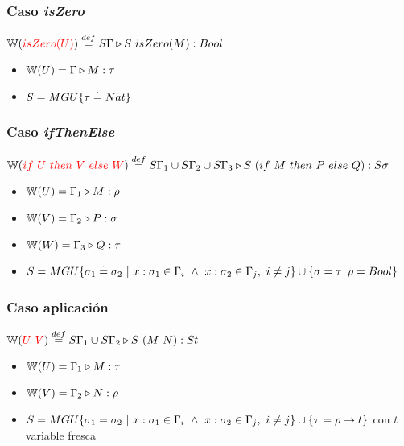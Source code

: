 \subsubsection{Caso \textit{isZero}}
$\mathbb{W}({\color{red}isZero(U)}) \overset{def}{=} S\Gamma\triangleright S~isZero(M) : Bool$
\begin{centrado}
	\begin{itemize}
		\item $\mathbb{W}(U) = \Gamma\triangleright M : \tau$
		\item $S = MGU\{\tau\overset{\cdot}{=} Nat\}$
	\end{itemize}
\end{centrado}

\subsubsection{Caso \textit{ifThenElse}}
$\mathbb{W}({\color{red}if~ U~ then~ V~ else~ W}) \overset{def}{=} S\Gamma_1\cup S\Gamma_2\cup S\Gamma_3\triangleright S~(if~ M~ then~ P~ else~ Q) : S\sigma$
\begin{centrado}
	\begin{itemize}
		\item $\mathbb{W}(U) = \Gamma_1\triangleright M : \rho$
		\item $\mathbb{W}(V) = \Gamma_2\triangleright P : \sigma$
		\item $\mathbb{W}(W) = \Gamma_3\triangleright Q : \tau$
		\item $S = MGU\{\sigma_1\overset{\cdot}{=} \sigma_2~|~x:\sigma_1\in\Gamma_i~\land~x:\sigma_2\in\Gamma_j,~i\neq j\}\cup\{\sigma\overset{\cdot}{=}\tau\,~\rho\overset{\cdot}{=} Bool\}$
	\end{itemize}
\end{centrado}

\subsubsection{Caso aplicación}
$\mathbb{W}({\color{red}U~V}) \overset{def}{=} S\Gamma_1\cup S\Gamma_2\triangleright S~(M~N) : St$
\begin{centrado}
	\begin{itemize}
		\item $\mathbb{W}(U) = \Gamma_1\triangleright M : \tau$
		\item $\mathbb{W}(V) = \Gamma_2\triangleright N : \rho$
		\item $S = MGU\{\sigma_1\overset{\cdot}{=} \sigma_2~|~x:\sigma_1\in\Gamma_i~\land~x:\sigma_2\in\Gamma_j,~i\neq j\}\cup\{\tau\overset{\cdot}{=}\rho\to t\}$ con $t$ variable fresca
	\end{itemize}
\end{centrado}

